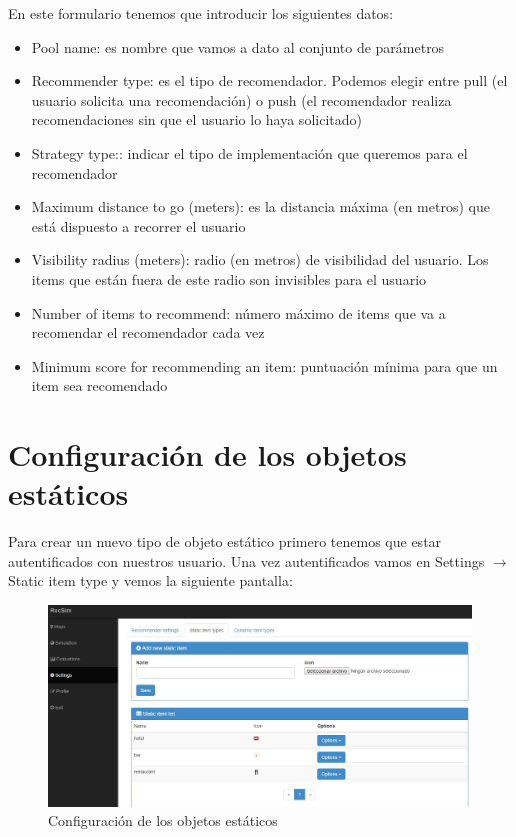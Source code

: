 En este formulario tenemos que introducir los siguientes datos:
\begin{itemize}
	\item Pool name: es nombre que vamos a dato al conjunto de parámetros
	\item Recommender type: es el tipo de recomendador. Podemos elegir entre pull (el usuario solicita una recomendación) o push (el recomendador realiza recomendaciones sin que el usuario lo haya solicitado)
	\item Strategy type:: indicar el tipo de implementación que queremos para el recomendador
	\item Maximum distance to go (meters): es la distancia máxima (en metros) que está dispuesto a recorrer el usuario
	\item Visibility radius (meters): radio (en metros) de visibilidad del usuario. Los items que están fuera de este radio son invisibles para el usuario 
	\item Number of items to recommend: número máximo de items que va a recomendar el recomendador cada vez
	\item Minimum score for recommending an item: puntuación mínima para que un item sea recomendado
\end{itemize}

\newpage

\section{Configuración de los objetos estáticos}\label{sec:confObjEstaticos}

Para crear un nuevo tipo de objeto estático primero tenemos que estar autentificados con nuestros usuario. Una vez autentificados vamos en Settings $\rightarrow$ Static item type y vemos la siguiente pantalla:

\begin{figure}[H]
	\centering\includegraphics[scale=0.35]{imagenes/capitulo3/config-objetos-estaticos.jpg}
	\caption{Configuración de los objetos estáticos}
	\label{img:ConfiguracionObjetosEstaticos}
\end{figure}

